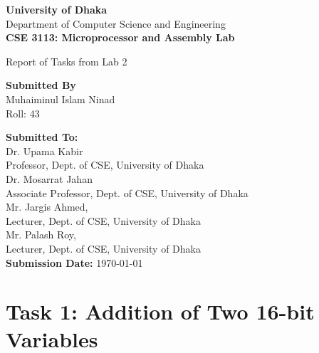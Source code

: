 \documentclass[12pt,a4paper]{article}
\begin{document}
\begin{titlepage}
    \centering
    
    \vspace*{1cm}
    {\fontsize{20}{24}\bfseries University of Dhaka}\\[0.4cm]
    {\large Department of Computer Science and Engineering}\\[1cm]
    
    \hline
    \vspace{.5cm}
    {\Large \textbf{CSE 3113: Microprocessor and Assembly Lab}\\[.5cm]}
    
    \Large{Report of Tasks from Lab 2}
    \vspace{.5cm}
    \hline
    
    \vspace{1.5cm}
    
    
    \begin{center}
        \textbf{Submitted By} \\
        Muhaiminul Islam Ninad \\
        Roll:  43
    \end{center}
    
    
    \vspace{1.5cm}
    
    {\large \textbf{Submitted To:}}\\[0.4cm]
    Dr. Upama Kabir \\
    Professor,  Dept. of CSE, University of Dhaka\\[.3cm]
    Dr. Mosarrat Jahan \\
    Associate Professor, Dept. of CSE, University of Dhaka \\[.3cm]
    Mr. Jargis Ahmed, \\
    Lecturer, Dept. of CSE, University of Dhaka\\[.3cm]
    Mr. Palash Roy, \\
    Lecturer, Dept. of CSE, University of Dhaka\\[1.3cm]
    
    {\large \textbf{Submission Date:} \today}
    
    \vfill
    
\end{titlepage}

\tableofcontents
\newpage

\section{Task 1: Addition of Two 16-bit Variables}
\end{document}
